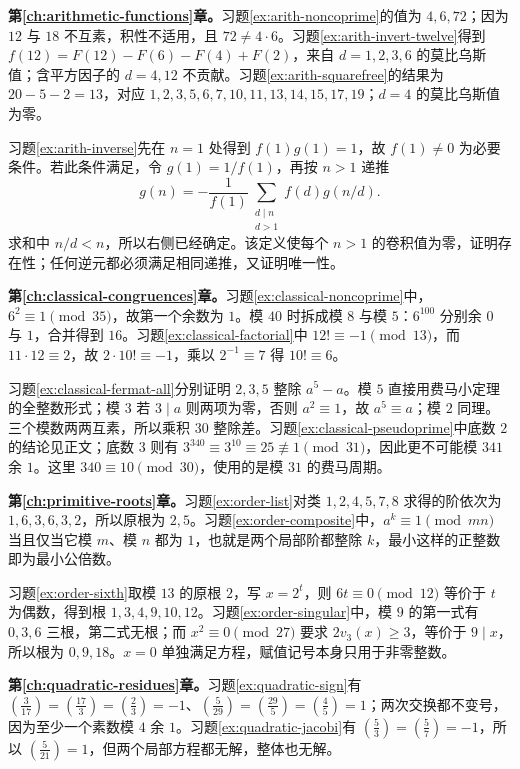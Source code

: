 \textbf{第\ref{ch:arithmetic-functions}章。}习题\ref{ex:arith-noncoprime}的值为 $4,6,72$；因为 $12$ 与 $18$ 不互素，积性不适用，且 $72\ne4\cdot6$。习题\ref{ex:arith-invert-twelve}得到 $f(12)=F(12)-F(6)-F(4)+F(2)$，来自 $d=1,2,3,6$ 的莫比乌斯值；含平方因子的 $d=4,12$ 不贡献。习题\ref{ex:arith-squarefree}的结果为 $20-5-2=13$，对应 $1,2,3,5,6,7,10,11,13,14,15,17,19$；$d=4$ 的莫比乌斯值为零。

习题\ref{ex:arith-inverse}先在 $n=1$ 处得到 $f(1)g(1)=1$，故 $f(1)\ne0$ 为必要条件。若此条件满足，令 $g(1)=1/f(1)$，再按 $n>1$ 递推
\[
 g(n)=-\frac1{f(1)}\sum_{\substack{d\mid n\\d>1}}f(d)g(n/d).
\]
求和中 $n/d<n$，所以右侧已经确定。该定义使每个 $n>1$ 的卷积值为零，证明存在性；任何逆元都必须满足相同递推，又证明唯一性。

\textbf{第\ref{ch:classical-congruences}章。}习题\ref{ex:classical-noncoprime}中，$6^2\equiv1\pmod{35}$，故第一个余数为 $1$。模 $40$ 时拆成模 $8$ 与模 $5$：$6^{100}$ 分别余 $0$ 与 $1$，合并得到 $16$。习题\ref{ex:classical-factorial}中 $12!\equiv-1\pmod{13}$，而 $11\cdot12\equiv2$，故 $2\cdot10!\equiv-1$，乘以 $2^{-1}\equiv7$ 得 $10!\equiv6$。

习题\ref{ex:classical-fermat-all}分别证明 $2,3,5$ 整除 $a^5-a$。模 $5$ 直接用费马小定理的全整数形式；模 $3$ 若 $3\mid a$ 则两项为零，否则 $a^2\equiv1$，故 $a^5\equiv a$；模 $2$ 同理。三个模数两两互素，所以乘积 $30$ 整除差。习题\ref{ex:classical-pseudoprime}中底数 $2$ 的结论见正文；底数 $3$ 则有 $3^{340}\equiv3^{10}\equiv25\not\equiv1\pmod{31}$，因此更不可能模 $341$ 余 $1$。这里 $340\equiv10\pmod{30}$，使用的是模 $31$ 的费马周期。

\textbf{第\ref{ch:primitive-roots}章。}习题\ref{ex:order-list}对类 $1,2,4,5,7,8$ 求得的阶依次为 $1,6,3,6,3,2$，所以原根为 $2,5$。习题\ref{ex:order-composite}中，$a^k\equiv1\pmod{mn}$ 当且仅当它模 $m$、模 $n$ 都为 $1$，也就是两个局部阶都整除 $k$，最小这样的正整数即为最小公倍数。

习题\ref{ex:order-sixth}取模 $13$ 的原根 $2$，写 $x=2^t$，则 $6t\equiv0\pmod{12}$ 等价于 $t$ 为偶数，得到根 $1,3,4,9,10,12$。习题\ref{ex:order-singular}中，模 $9$ 的第一式有 $0,3,6$ 三根，第二式无根；而 $x^2\equiv0\pmod{27}$ 要求 $2v_3(x)\ge3$，等价于 $9\mid x$，所以根为 $0,9,18$。$x=0$ 单独满足方程，赋值记号本身只用于非零整数。

\textbf{第\ref{ch:quadratic-residues}章。}习题\ref{ex:quadratic-sign}有 $\left(\frac3{17}\right)=\left(\frac{17}3\right)=\left(\frac23\right)=-1$、$\left(\frac5{29}\right)=\left(\frac{29}5\right)=\left(\frac45\right)=1$；两次交换都不变号，因为至少一个素数模 $4$ 余 $1$。习题\ref{ex:quadratic-jacobi}有 $\left(\frac53\right)=\left(\frac57\right)=-1$，所以 $\left(\frac5{21}\right)=1$，但两个局部方程都无解，整体也无解。

